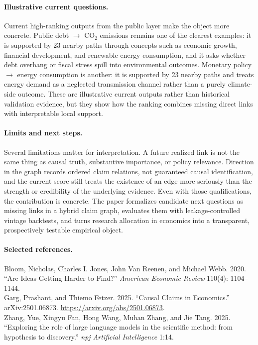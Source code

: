 \documentclass[11pt]{article}
\begin{document}
\paragraph{Illustrative current questions.}
Current high-ranking outputs from the public layer make the object more concrete. Public debt \(\rightarrow\) CO\(_2\) emissions remains one of the clearest examples: it is supported by 23 nearby paths through concepts such as economic growth, financial development, and renewable energy consumption, and it asks whether debt overhang or fiscal stress spill into environmental outcomes. Monetary policy \(\rightarrow\) energy consumption is another: it is supported by 23 nearby paths and treats energy demand as a neglected transmission channel rather than a purely climate-side outcome. These are illustrative current outputs rather than historical validation evidence, but they show how the ranking combines missing direct links with interpretable local support.

\paragraph{Limits and next steps.}
Several limitations matter for interpretation. A future realized link is not the same thing as causal truth, substantive importance, or policy relevance. Direction in the graph records ordered claim relations, not guaranteed causal identification, and the current score still treats the existence of an edge more seriously than the strength or credibility of the underlying evidence. Even with those qualifications, the contribution is concrete. The paper formalizes candidate next questions as missing links in a hybrid claim graph, evaluates them with leakage-controlled vintage backtests, and turns research allocation in economics into a transparent, prospectively testable empirical object.

\paragraph{Selected references.}
\begin{small}
Bloom, Nicholas, Charles I. Jones, John Van Reenen, and Michael Webb. 2020. ``Are Ideas Getting Harder to Find?'' \textit{American Economic Review} 110(4): 1104--1144.\\
Garg, Prashant, and Thiemo Fetzer. 2025. ``Causal Claims in Economics.'' arXiv:2501.06873. \url{https://arxiv.org/abs/2501.06873}.\\
Zhang, Yue, Xingyu Fan, Hong Wang, Muhan Zhang, and Jie Tang. 2025. ``Exploring the role of large language models in the scientific method: from hypothesis to discovery.'' \textit{npj Artificial Intelligence} 1:14.
\end{small}
\end{document}

